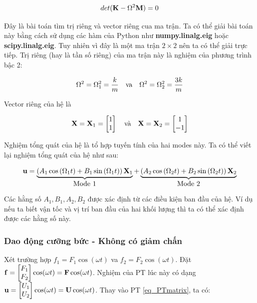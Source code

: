 \begin{equation}
    det({\bf K}-\Omega^2{\bf M}) = 0
\end{equation}

Đây là bài toán tìm trị riêng và vector riêng cua ma trận. Ta có thể giải bài toán này bằng cách sử dụng các hàm của Python như \textbf{numpy.linalg.eig} hoặc \textbf{scipy.linalg.eig}. Tuy nhiên vì đây là một ma trận $2\times 2$ nên ta có thể giải trực tiếp. Trị riêng (hay là tần số riêng) của ma trận này là nghiệm của phương trình bậc 2:

\begin{equation}
    \Omega^2 =  \Omega_1^2 = \frac{k}{m} \quad \hbox{va} \quad \Omega^2 = \Omega_2^2 = \frac{3k}{m}
\end{equation}

Vector riêng của hệ là

\begin{equation}
    {\bf X} = {\bf X}_1 = \begin{bmatrix}
        1 \\ 1
    \end{bmatrix} \quad \hbox{và} \quad {\bf X} = {\bf X}_2 = \begin{bmatrix}
        1 \\ -1
    \end{bmatrix}
\end{equation}

Nghiệm tổng quát của hệ là tổ hợp tuyến tính của hai modes này. Ta có thể viết lại nghiệm tổng quát của hệ như sau:

\begin{equation}
    {\bf u}=\underbrace{\left(A_1 \cos \left(\Omega_1 t\right)+B_1 \sin \left(\Omega_1 t\right)\right) {\bf X}_1}_{\hbox{Mode 1}}+\underbrace{\left(A_2 \cos \left(\Omega_2 t\right)+B_2 \sin \left(\Omega_2 t\right)\right) {\bf X}_2}_{\hbox{Mode 2}}
\end{equation}

Các hằng số $A_1, B_1, A_2, B_2$ được xác định từ các điều kiện ban đầu của hệ. Ví dụ nếu ta biết vận tốc và vị trí ban đầu của hai khối lượng thì ta có thể xác định được các hằng số này.

\subsubsection{Dao động cưỡng bức - Không có giảm chấn}

Xét trường hợp $f_1 = F_1\cos(\omega t)$ va $f_2 = F_2\cos(\omega t)$. Đặt ${\bf f} = \begin{bmatrix} F_1 \\ F_2\end{bmatrix}\cos(\omega t) = {\bf F}\cos(\omega t)$. Nghiệm của PT lúc này có dạng ${\bf u} = \begin{bmatrix} U_1 \\ U_2\end{bmatrix}\cos(\omega t) = {\bf U}\cos(\omega t)$. Thay vào PT \cref{eq_PTmatrix}, ta có:

